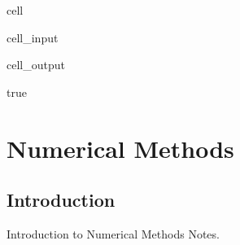 \documentclass[a4paper,10pt,english]{jupyterBook}
\begin{document}
\begin{sphinxuseclass}{cell}\begin{sphinxVerbatimInput}

\begin{sphinxuseclass}{cell_input}
\begin{sphinxVerbatim}[commandchars=\\\{\}]

\end{sphinxVerbatim}

\end{sphinxuseclass}\end{sphinxVerbatimInput}
\begin{sphinxVerbatimOutput}

\begin{sphinxuseclass}{cell_output}
\begin{sphinxVerbatim}[commandchars=\\\{\}]
true
\end{sphinxVerbatim}

\end{sphinxuseclass}\end{sphinxVerbatimOutput}

\end{sphinxuseclass}
\sphinxstepscope


\part{Numerical Methods}

\sphinxstepscope


\chapter{Introduction}
\label{\detokenize{text/num/intro:introduction}}\label{\detokenize{text/num/intro::doc}}
\sphinxAtStartPar
Introduction to Numerical Methods Notes.







\renewcommand{\indexname}{Index}
\printindex
\end{document}
